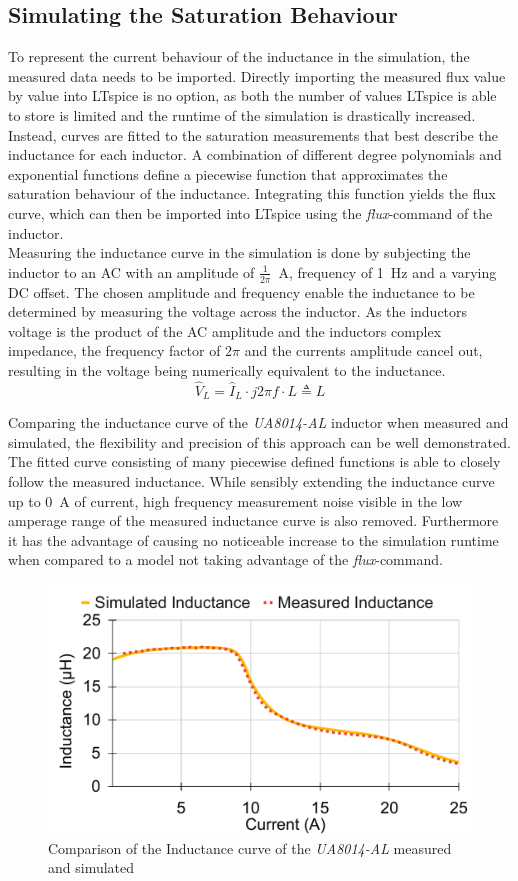 \subsection{Simulating the Saturation Behaviour}
To represent the current behaviour of the inductance in the simulation, the measured data needs to be imported. Directly importing the measured flux value by value into LTspice is no option, as both the number of values LTspice is able to store is limited and the runtime of the simulation is drastically increased. Instead, curves are fitted to the saturation measurements that best describe the inductance for each inductor. A combination of different degree polynomials and exponential functions define a piecewise function that approximates the saturation behaviour of the inductance. Integrating this function yields the flux curve, which can then be imported into LTspice using the \textit{flux}-command of the inductor.\\
Measuring the inductance curve in the simulation is done by subjecting the inductor to an \ac{AC} with an amplitude of $\frac{1}{2\pi}$\SI{ }{\A}, frequency of \SI{1}{\Hz} and a varying \ac{DC} offset. The chosen amplitude and frequency enable the inductance to be determined by measuring the voltage across the inductor. As the inductors voltage is the product of the \ac{AC} amplitude and the inductors complex impedance, the frequency factor of $2\pi$ and the currents amplitude cancel out, resulting in the voltage being numerically equivalent to the inductance.
\begin{equation}\label{eq:inductance_from_voltage}
    \hat{V}_L = \hat{I}_L \cdot j 2\pi f\cdot L \triangleq L
\end{equation}

Comparing the inductance curve of the \textit{UA8014-AL} inductor when measured and simulated, the flexibility and precision of this approach can be well demonstrated. The fitted curve consisting of many piecewise defined functions is able to closely follow the measured inductance. While sensibly extending the inductance curve up to \SI{0}{\A} of current, high frequency measurement noise visible in the low amperage range of the measured inductance curve is also removed. Furthermore it has the advantage of causing no noticeable increase to the simulation runtime when compared to a model not taking advantage of the \textit{flux}-command. 
\begin{figure}[H]
    \centering
    \includegraphics[width=0.7\linewidth]{Bilder/Kapitel3/Saturation_Measured_vs_LTspice.pdf}
    \caption{Comparison of the Inductance curve of the \textit{UA8014-AL} measured and simulated}
    \label{fig:comparison_of_saturation}
\end{figure}

